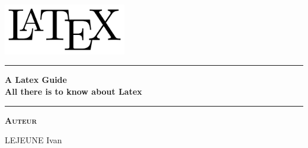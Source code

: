 \begin{titlepage}
\begin{center}
\vspace{2cm}
\includegraphics[width=0.4\textwidth]{resources/LaTeX_logo.png}~\\[1cm]
\vspace{2cm}

\hrule
\vspace{.5cm}
{\huge\bfseries{A Latex Guide\\ All there is to know about Latex}} %
\vspace{.5cm}

\hrule
\vspace{1.5cm}

\textsc{\textbf{Auteur}}\\
\vspace{.5cm}
\centering

LEJEUNE Ivan\\



\vspace{4cm}

\centering {} %
\end{center}
\end{titlepage}